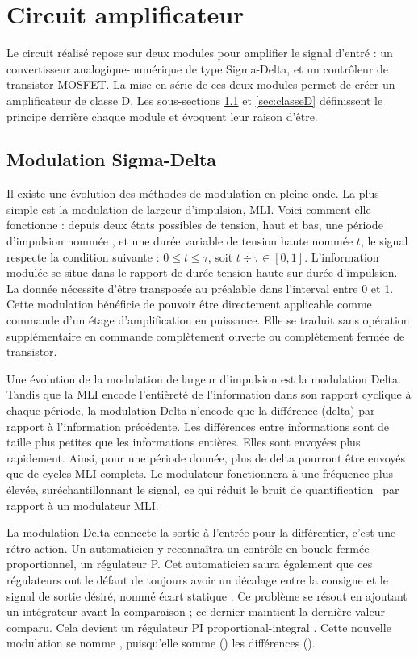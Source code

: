 \documentclass[10pt, oneside, a4paper]{article}
\newcommand{\important}[1]{\textbf{\textsf{\color{gray}{#1}}}}
\begin{document}
\section{Circuit amplificateur}
Le circuit réalisé repose sur deux modules pour amplifier le signal d'entré :
un convertisseur analogique-numérique de type Sigma-Delta, et un contrôleur de transistor MOSFET.
La mise en série de ces deux modules permet de créer un amplificateur de classe D.
Les sous-sections \ref{sec:sigmaDelta} et \ref{sec:classeD} définissent le principe derrière chaque module et évoquent leur raison d'être.


\subsection{Modulation Sigma-Delta}
	\label{sec:sigmaDelta}
Il existe une évolution des méthodes de modulation en pleine onde.
La plus simple est la modulation de largeur d'impulsion, MLI.
Voici comment elle fonctionne : depuis deux états possibles de tension, haut et bas, une période d'impulsion nommée \tau, et une durée variable de tension haute nommée $t$, le signal respecte la condition suivante : $0 \leq t \leq \tau $, soit $t \div \tau \in [0,1]$.
L'information modulée se situe dans le rapport de durée tension haute sur durée d'impulsion.
La donnée nécessite d'être transposée au préalable dans l'interval entre 0 et 1.
Cette modulation bénéficie de pouvoir être directement applicable comme commande d'un étage d'amplification en puissance.
Elle se traduit sans opération supplémentaire en commande complètement ouverte ou complètement fermée de transistor.

Une évolution de la modulation de largeur d'impulsion est la modulation Delta.
Tandis que la MLI encode l'entièreté de l'information dans son rapport cyclique à chaque période, la modulation Delta n'encode que la différence (delta) par rapport à l'information précédente.
Les différences entre informations sont de taille plus petites que les informations entières.
Elles sont envoyées plus rapidement.
Ainsi, pour une période donnée, plus de delta pourront être envoyés que de cycles MLI complets.
Le modulateur fonctionnera à une fréquence plus élevée, suréchantillonnant le signal, ce qui réduit le bruit de quantification~\cite{gray1998quantization} par rapport à un modulateur MLI.

La modulation Delta connecte la sortie à l'entrée pour la différentier, c'est une rétro-action.
Un automaticien y reconnaîtra un contrôle en boucle fermée proportionnel, un régulateur P.
Cet automaticien saura également que ces régulateurs ont le défaut de toujours avoir un décalage entre la consigne et le signal de sortie désiré, nommé \og écart statique \fg{}.
Ce problème se résout en ajoutant un intégrateur avant la comparaison ; ce dernier maintient la dernière valeur comparu.
Cela devient un régulateur PI \og proportional-integral \fg{}.
Cette nouvelle modulation se nomme \important{Sigma-Delta}, puisqu'elle somme (\Sigma) les différences (\Delta).
\end{document}
